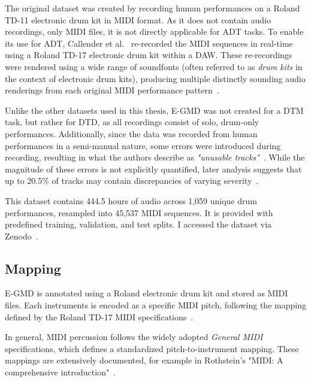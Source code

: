 The original dataset was created by recording human performances on a Roland TD-11 electronic drum kit in MIDI format. As it does not contain audio recordings, only MIDI files, it is not directly applicable for \gls{ADT} tasks. To enable its use for \gls{ADT}, Callender et al.~\cite{callender2020improvingperceptualqualitydrum} re-recorded the MIDI sequences in real-time using a Roland TD-17 electronic drum kit within a \gls{DAW}. These re-recordings were rendered using a wide range of soundfonts (often referred to as \textit{drum kits} in the context of electronic drum kits), producing multiple distinctly sounding audio renderings from each original MIDI performance pattern~\cite{pmlr-v97-gillick19a, callender2020improvingperceptualqualitydrum}.

Unlike the other datasets used in this thesis, E-GMD was not created for a \gls{DTM} task, but rather for \gls{DTD}, as all recordings consist of solo, drum-only performances. Additionally, since the data was recorded from human performances in a semi-manual nature, some errors were introduced during recording, resulting in what the authors describe as \textit{"unusable tracks"}~\cite{callender2020improvingperceptualqualitydrum}. While the magnitude of these errors is not explicitly quantified, later analysis suggests that up to 20.5\% of tracks may contain discrepancies of varying severity~\cite{holz2021automatic}.

This dataset contains 444.5 hours of audio across 1,059 unique drum performances, resampled into 45,537 MIDI sequences. It is provided with predefined training, validation, and test splits. I accessed the dataset via Zenodo~\cite{callender_2020_4300943, callender2020improvingperceptualqualitydrum}.

\subsection{Mapping}

E-GMD is annotated using a Roland electronic drum kit and stored as MIDI files. Each instruments is encoded as a specific MIDI pitch, following the mapping defined by the Roland TD-17 MIDI specifications~\cite{pmlr-v97-gillick19a, callender2020improvingperceptualqualitydrum, roland_drum_midi_td_17}.

In general, MIDI percussion follows the widely adopted \textit{General MIDI} specifications, which defines a standardized pitch-to-instrument mapping. These mappings are extensively documented, for example in Rothstein's "MIDI: A comprehensive introduction"~\cite{rothstein1995midi}.

